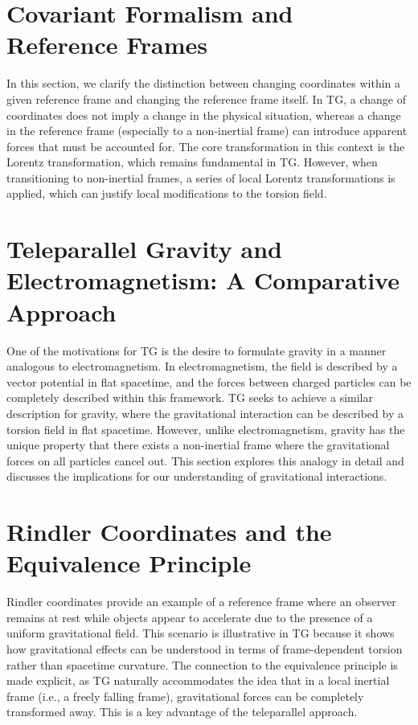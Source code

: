 \documentclass[USletter,11pt]{article}
\begin{document}
\section{Covariant Formalism and Reference Frames}
In this section, we clarify the distinction between changing coordinates within a given reference frame and changing the reference frame itself. In TG, a change of coordinates does not imply a change in the physical situation, whereas a change in the reference frame (especially to a non-inertial frame) can introduce apparent forces that must be accounted for. The core transformation in this context is the Lorentz transformation, which remains fundamental in TG. However, when transitioning to non-inertial frames, a series of local Lorentz transformations is applied, which can justify local modifications to the torsion field.

\section{Teleparallel Gravity and Electromagnetism: A Comparative Approach}
One of the motivations for TG is the desire to formulate gravity in a manner analogous to electromagnetism. In electromagnetism, the field is described by a vector potential in flat spacetime, and the forces between charged particles can be completely described within this framework. TG seeks to achieve a similar description for gravity, where the gravitational interaction can be described by a torsion field in flat spacetime. However, unlike electromagnetism, gravity has the unique property that there exists a non-inertial frame where the gravitational forces on all particles cancel out. This section explores this analogy in detail and discusses the implications for our understanding of gravitational interactions.

\section{Rindler Coordinates and the Equivalence Principle}
Rindler coordinates provide an example of a reference frame where an observer remains at rest while objects appear to accelerate due to the presence of a uniform gravitational field. This scenario is illustrative in TG because it shows how gravitational effects can be understood in terms of frame-dependent torsion rather than spacetime curvature. The connection to the equivalence principle is made explicit, as TG naturally accommodates the idea that in a local inertial frame (i.e., a freely falling frame), gravitational forces can be completely transformed away. This is a key advantage of the teleparallel approach.
\end{document}
